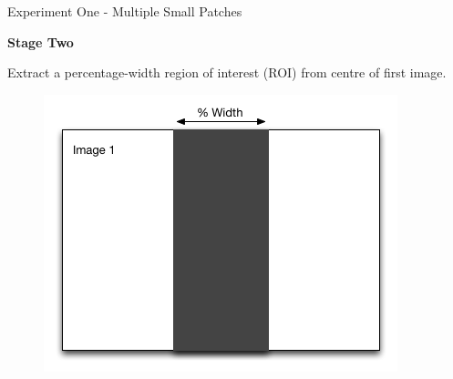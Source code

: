\documentclass[10pt, compress]{beamer}
\begin{document}
\begin{frame}{Experiment One - Multiple Small Patches}

\textbf{Stage Two} \\ \vspace{0.2cm}

Extract a percentage-width region of interest (ROI) from centre of first image.

\begin{figure}[ht!]
\centering
\includegraphics[scale=0.5]{stage1.png}
  \end{figure}
  
\end{frame}
\end{document}
